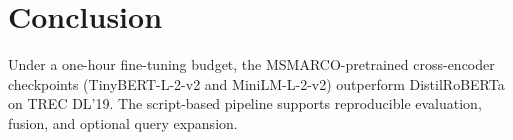 \documentclass[sigconf]{acmart}
\begin{document}
\section{Conclusion}
Under a one-hour fine-tuning budget, the MSMARCO-pretrained cross-encoder checkpoints (TinyBERT-L-2-v2 and MiniLM-L-2-v2) outperform DistilRoBERTa on TREC DL'19. The script-based pipeline supports reproducible evaluation, fusion, and optional query expansion.
\end{document}
